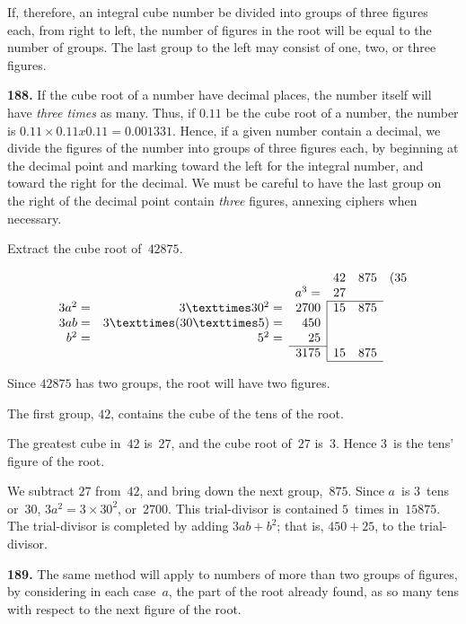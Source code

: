 \documentclass[12pt]{book}[2005/09/16]
\makeatletter
\newcommand{\ScreenBreak}{\ifthenelse{\not\boolean{ForPrinting}}{\newpage}{}}
\newcommand{\Paragraph}[1]{\medskip\par\textbf{#1}}
\newenvironment{Soln}[1][]{\par\small\textsc{#1}}{\par}
\newcommand{\DPtypo}[2]{#2}
\newcommand{\Add}[1]{\DPtypo{}{#1}}
\newcommand{\TbBar}[1]{\multicolumn{1}{@{}r|}{#1}}
\makeatother
\begin{document}
If, therefore, an integral cube number be divided into
groups of three figures each, from right to left, the number
of figures in the root will be equal to the number of groups\Add{.}
The last group to the left may consist of one, two, or three
figures.

\Paragraph{188.}  If the cube root of a number have decimal places,
the number itself will have \emph{three times} as many.  Thus, if
$0.11$ be the cube root of a number\Add{,} the number is $0.11 × 0.11
x 0.11 = 0.001331$.  Hence\Add{,} if a given number contain a
decimal, we divide the figures of the number into groups
of three figures each, by beginning at the decimal point
and marking toward the left for the integral number, and
toward the right for the decimal.  We must be careful to
have the last group on the right of the decimal point contain
\emph{three} figures, annexing ciphers when necessary.

\ScreenBreak
Extract the cube root of~$42875$.
\begin{Soln}
\[
\begin{array}{rrrlll}
        &               &              & 42&875&(35 \\
        &               &       a^{3} =& 27 \\
\cline{4-5}
3a^{2} =&   3 × 30^{2} =& \TbBar{2700} & 15&875 \\
   3ab =& 3 × (30 × 5) =&  \TbBar{450} \\
 b^{2} =&        5^{2} =&   \TbBar{25} \\
\cline{3-3}
        &               & \TbBar{3175} & 15&875 \\
\cline{4-5}
\end{array}
\]

Since $42875$ has two groups, the root will have two figures.

The first group, $42$, contains the cube of the tens of the root.

The greatest cube in~$42$ is~$27$, and the cube root of~$27$ is~$3$.  Hence
$3$~is the tens' figure of the root.

We subtract $27$ from~$42$, and bring down the next group,~$875$.
Since $a$~is $3$~tens or~$30$, $3a^{2} = 3 × 30^{2}$, or~$2700$.  This trial-divisor is
contained $5$~times in~$15875$.  The trial-divisor is completed by adding
$3ab + b^{2}$; that is, $450 + 25$, to the trial-divisor.
\end{Soln}

\Paragraph{189.}  The same method will apply to numbers of more
than two groups of figures, by considering in each case~$a$,
the part of the root already found, as so many tens with
respect to the next figure of the root.
\end{document}
